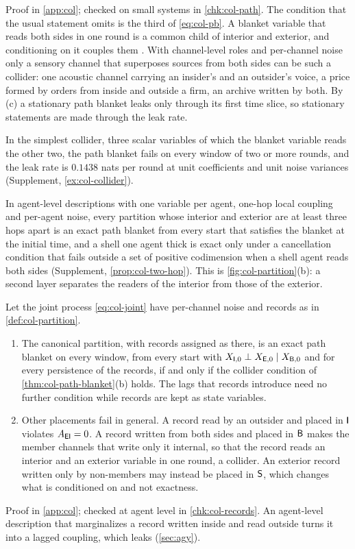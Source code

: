 Proof in \cref{app:col}; checked on small systems in \cref{chk:col-path}. The condition that the usual statement omits is the third of \eqref{eq:col-pb}. A blanket variable that reads both sides in one round is a common child of interior and exterior, and conditioning on it couples them \citep{pearl1988probabilistic}. With channel-level roles and per-channel noise only a sensory channel that superposes sources from both sides can be such a collider: one acoustic channel carrying an insider's and an outsider's voice, a price formed by orders from inside and outside a firm, an archive written by both. By (c) a stationary path blanket leaks only through its first time slice, so stationary statements are made through the leak rate.

In the simplest collider, three scalar variables of which the blanket variable reads the other two, the path blanket fails on every window of two or more rounds, and the leak rate is $0.1438$ nats per round at unit coefficients and unit noise variances (Supplement, \cref{ex:col-collider}).

In agent-level descriptions with one variable per agent, one-hop local coupling and per-agent noise, every partition whose interior and exterior are at least three hops apart is an exact path blanket from every start that satisfies the blanket at the initial time, and a shell one agent thick is exact only under a cancellation condition that fails outside a set of positive codimension when a shell agent reads both sides (Supplement, \cref{prop:col-two-hop}). This is \cref{fig:col-partition}(b): a second layer separates the readers of the interior from those of the exterior.

\begin{proposition}\label{prop:col-records-partition}
Let the joint process \eqref{eq:col-joint} have per-channel noise and records as in \cref{def:col-partition}.
\begin{enumerate}
\item[(a)] The canonical partition, with records assigned as there, is an exact path blanket on every window, from every start with $X_{\mathsf{I},0}\perp X_{\mathsf{E},0}\mid X_{\mathsf{B},0}$ and for every persistence of the records, if and only if the collider condition of \cref{thm:col-path-blanket}(b) holds. The lags that records introduce need no further condition while records are kept as state variables.
\item[(b)] Other placements fail in general. A record read by an outsider and placed in $\mathsf{I}$ violates $A_{\mathsf{E}\mathsf{I}}=0$. A record written from both sides and placed in $\mathsf{B}$ makes the member channels that write only it internal, so that the record reads an interior and an exterior variable in one round, a collider. An exterior record written only by non-members may instead be placed in $\mathsf{S}$, which changes what is conditioned on and not exactness.
\end{enumerate}
\end{proposition}
Proof in \cref{app:col}; checked at agent level in \cref{chk:col-records}. An agent-level description that marginalizes a record written inside and read outside turns it into a lagged coupling, which leaks (\cref{sec:agy}).

